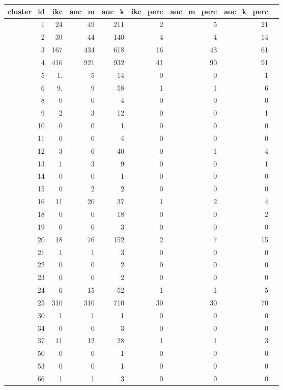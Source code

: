\documentclass[11pt, oneside]{article}   	%
\begin{document}
\begin{table}[ht]
\centering
\begin{tabular}{rrrrrrrr}
  \hline
cluster\_id & ikc & aoc\_m & aoc\_k & ikc\_perc & aoc\_m\_perc & aoc\_k\_perc \\ 
  \hline
1 & 24 &  49 & 211 &   2 &   5 &  21 \\ 
2 & 39 &  44 & 140 &   4 &   4 &  14 \\ 
3 & 167 & 434 & 618 &  16 &  43 &  61 \\ 
4 & 416 & 921 & 932 &  41 &  90 &  91 \\ 
5 & 1. &   5 &  14 &   0 &   0 &   1 \\ 
6 & 9. &   9 &  58 &   1 &   1 &   6 \\ 
8 & 0 &   0 &   4 &   0 &   0 &   0 \\ 
9 & 2 &   3 &  12 &   0 &   0 &   1 \\ 
10 & 0 &   0 &   1 &   0 &   0 &   0 \\ 
11 & 0 &   0 &   4 &   0 &   0 &   0 \\ 
12 & 3 &   6 &  40 &   0 &   1 &   4 \\ 
13 & 1 &   3 &   9 &   0 &   0 &   1 \\ 
14 & 0 &   0 &   1 &   0 &   0 &   0 \\ 
15 & 0 &   2 &   2 &   0 &   0 &   0 \\ 
16 & 11 &  20 &  37 &   1 &   2 &   4 \\ 
18 & 0 &   0 &  18 &   0 &   0 &   2 \\ 
19 & 0 &   0 &   3 &   0 &   0 &   0 \\ 
20 & 18 &  76 & 152 &   2 &   7 &  15 \\ 
21 & 1 &   1 &   3 &   0 &   0 &   0 \\ 
22 & 0 &   0 &   2 &   0 &   0 &   0 \\ 
23 & 0 &   0 &   2 &   0 &   0 &   0 \\ 
24 & 6 &  15 &  52 &   1 &   1 &   5 \\ 
25 & 310 & 310 & 710 &  30 &  30 &  70 \\ 
30 & 1 &   1 &   1 &   0 &   0 &   0 \\ 
34 & 0 &   0 &   3 &   0 &   0 &   0 \\ 
37 & 11 &  12 &  28 &   1 &   1 &   3 \\ 
50 & 0 &   0 &   1 &   0 &   0 &   0 \\ 
53 & 0 &   0 &   1 &   0 &   0 &   0 \\ 
66 & 1 &   1 &   3 &   0 &   0 &   0 \\ 

\end{tabular}
\end{table}
\end{document}
